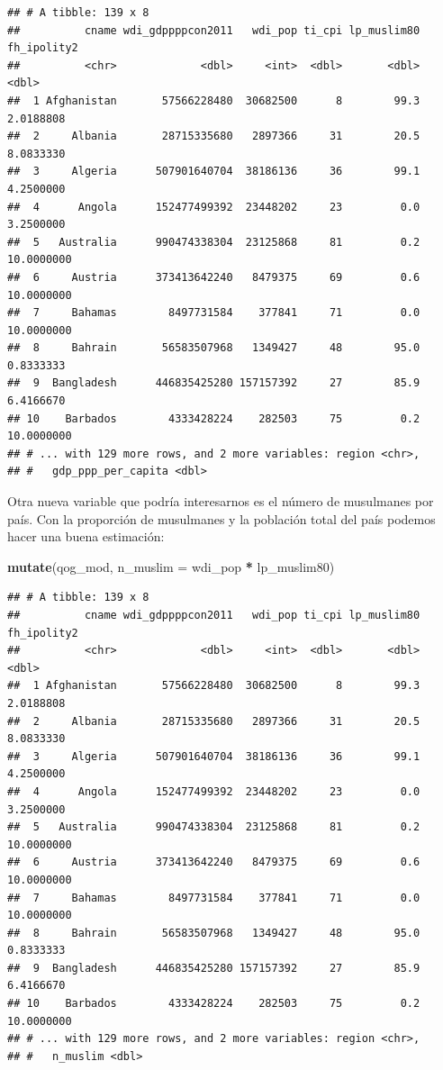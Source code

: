 \documentclass[]{book}
\newenvironment{Shaded}{\begin{snugshade}}{\end{snugshade}}
\newcommand{\KeywordTok}[1]{\textcolor[rgb]{0.13,0.29,0.53}{\textbf{#1}}}
\newcommand{\DataTypeTok}[1]{\textcolor[rgb]{0.13,0.29,0.53}{#1}}
\newcommand{\StringTok}[1]{\textcolor[rgb]{0.31,0.60,0.02}{#1}}
\newcommand{\OperatorTok}[1]{\textcolor[rgb]{0.81,0.36,0.00}{\textbf{#1}}}
\newcommand{\NormalTok}[1]{#1}
\begin{document}
\begin{verbatim}
## # A tibble: 139 x 8
##          cname wdi_gdppppcon2011   wdi_pop ti_cpi lp_muslim80 fh_ipolity2
##          <chr>             <dbl>     <int>  <dbl>       <dbl>       <dbl>
##  1 Afghanistan       57566228480  30682500      8        99.3   2.0188808
##  2     Albania       28715335680   2897366     31        20.5   8.0833330
##  3     Algeria      507901640704  38186136     36        99.1   4.2500000
##  4      Angola      152477499392  23448202     23         0.0   3.2500000
##  5   Australia      990474338304  23125868     81         0.2  10.0000000
##  6     Austria      373413642240   8479375     69         0.6  10.0000000
##  7     Bahamas        8497731584    377841     71         0.0  10.0000000
##  8     Bahrain       56583507968   1349427     48        95.0   0.8333333
##  9  Bangladesh      446835425280 157157392     27        85.9   6.4166670
## 10    Barbados        4333428224    282503     75         0.2  10.0000000
## # ... with 129 more rows, and 2 more variables: region <chr>,
## #   gdp_ppp_per_capita <dbl>
\end{verbatim}

Otra nueva variable que podría interesarnos es el número de musulmanes
por país. Con la proporción de musulmanes y la población total del país
podemos hacer una buena estimación:

\begin{Shaded}
\begin{Highlighting}[]
\KeywordTok{mutate}\NormalTok{(qog_mod, }\DataTypeTok{n_muslim =}\NormalTok{ wdi_pop }\OperatorTok{*}\StringTok{ }\NormalTok{lp_muslim80)}
\end{Highlighting}
\end{Shaded}

\begin{verbatim}
## # A tibble: 139 x 8
##          cname wdi_gdppppcon2011   wdi_pop ti_cpi lp_muslim80 fh_ipolity2
##          <chr>             <dbl>     <int>  <dbl>       <dbl>       <dbl>
##  1 Afghanistan       57566228480  30682500      8        99.3   2.0188808
##  2     Albania       28715335680   2897366     31        20.5   8.0833330
##  3     Algeria      507901640704  38186136     36        99.1   4.2500000
##  4      Angola      152477499392  23448202     23         0.0   3.2500000
##  5   Australia      990474338304  23125868     81         0.2  10.0000000
##  6     Austria      373413642240   8479375     69         0.6  10.0000000
##  7     Bahamas        8497731584    377841     71         0.0  10.0000000
##  8     Bahrain       56583507968   1349427     48        95.0   0.8333333
##  9  Bangladesh      446835425280 157157392     27        85.9   6.4166670
## 10    Barbados        4333428224    282503     75         0.2  10.0000000
## # ... with 129 more rows, and 2 more variables: region <chr>,
## #   n_muslim <dbl>
\end{verbatim}
\end{document}
